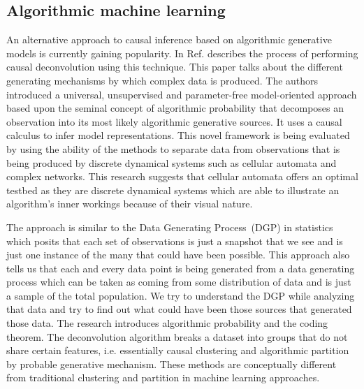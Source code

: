 \subsection{Algorithmic machine learning}


An alternative approach to causal inference based on algorithmic generative models is currently gaining popularity. In 
Ref.\cite{zenil2019causal} describes the process of performing causal deconvolution using this technique.
This paper talks about the different generating mechanisms by which complex data is produced. 
The authors introduced a universal, unsupervised and parameter-free model-oriented approach based upon the seminal concept of algorithmic probability that decomposes an observation into its most likely algorithmic generative sources. 
It uses a causal calculus to infer model representations. 
This novel framework is being evaluated by using the ability of the methods to separate data from observations that is being produced by discrete dynamical systems such as cellular automata and complex networks.
This research suggests that cellular automata offers an optimal testbed as they are discrete dynamical systems which are able to illustrate an algorithm's inner workings because of their visual nature. 

The approach is similar to the Data Generating Process~(DGP) in statistics which posits that each set of observations is just a snapshot that we see and is just one instance of the many that could have been possible. 
This approach also tells us that each and every data point is being generated from a data generating process which can be taken as coming from some distribution of data and is just a sample of the total population. 
We try to understand the DGP while analyzing that data and try to find out what could have been those sources that generated those data.
The research introduces algorithmic probability and the coding theorem. 
The deconvolution algorithm breaks a dataset into groups that do not share certain features, i.e. essentially causal clustering and algorithmic partition by probable generative mechanism.
These methods are conceptually different from traditional clustering and partition in machine learning approaches.

